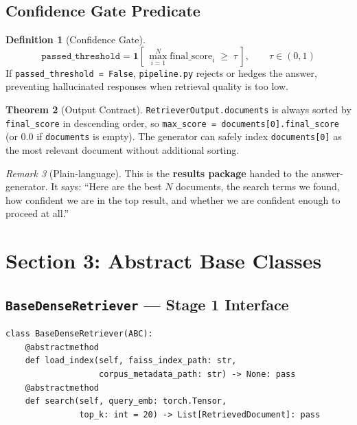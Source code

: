 \documentclass[12pt,a4paper]{article}
\theoremstyle{definition}
\newtheorem{theorem}{Theorem}[section]
\newtheorem{definition}[theorem]{Definition}
\theoremstyle{remark}
\newtheorem{remark}[theorem]{Remark}
\begin{document}
\subsection{Confidence Gate Predicate}

\begin{definition}[Confidence Gate]
\[
  \texttt{passed\_threshold}
  = \mathbf{1}\!\left[\,\max_{i=1}^N \text{final\_score}_i \;\geq\; \tau\,\right],
  \qquad \tau \in (0, 1)
\]
If \texttt{passed\_threshold = False}, \texttt{pipeline.py} rejects or
hedges the answer, preventing hallucinated responses when retrieval quality
is too low.
\end{definition}

\begin{theorem}[Output Contract]
\texttt{RetrieverOutput.documents} is always sorted by \texttt{final\_score}
in descending order, so \texttt{max\_score = documents[0].final\_score}
(or $0.0$ if \texttt{documents} is empty). The generator can safely index
\texttt{documents[0]} as the most relevant document without additional sorting.
\end{theorem}

\begin{remark}[Plain-language]
This is the \textbf{results package} handed to the answer-generator.
It says: ``Here are the best $N$ documents, the search terms we found,
how confident we are in the top result, and whether we are confident
enough to proceed at all.''
\end{remark}

\section{Section 3: Abstract Base Classes}

\subsection{\texttt{BaseDenseRetriever} --- Stage 1 Interface}

\begin{lstlisting}[caption={\texttt{BaseDenseRetriever} ABC}]
class BaseDenseRetriever(ABC):
    @abstractmethod
    def load_index(self, faiss_index_path: str,
                   corpus_metadata_path: str) -> None: pass
    @abstractmethod
    def search(self, query_emb: torch.Tensor,
               top_k: int = 20) -> List[RetrievedDocument]: pass
\end{lstlisting}
\end{document}
